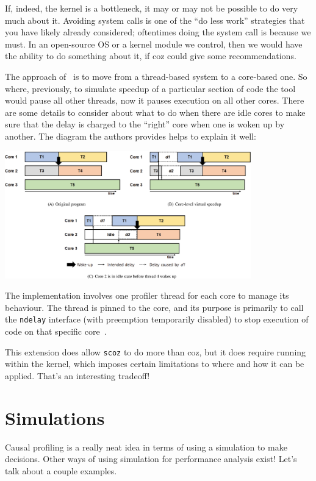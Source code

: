 If, indeed, the kernel is a bottleneck, it may or may not be possible to do very much about it. Avoiding system calls is one of the ``do less work'' strategies that you have likely already considered; oftentimes doing the system call is because we must. In an open-source OS or a kernel module we control, then we would have the ability to do something about it, if coz could give some recommendations.

The approach of~\cite{scoz} is to move from a thread-based system to a core-based one. So where, previously, to simulate speedup of a particular section of code the tool would pause all other threads, now it pauses execution on all other cores. There are some details to consider about what to do when there are idle cores to make sure that the delay is charged to the ``right'' core when one is woken up by another. The diagram the authors provides helps to explain it well:

\begin{center}
	\includegraphics[width=0.8\textwidth]{images/scoz-delay.jpg}
\end{center}

The implementation involves one profiler thread for each core to manage its behaviour. The thread is pinned to the core, and its purpose is primarily to call the \texttt{ndelay} interface (with preemption temporarily disabled) to stop execution of code on that specific core~\cite{scoz}. 

This extension does allow \texttt{scoz} to do more than coz, but it does require running within the kernel, which imposes certain limitations to where and how it can be applied. That's an interesting tradeoff!

\section*{Simulations}
Causal profiling is a really neat idea in terms of using a simulation to make decisions. Other ways of using simulation for performance analysis exist! Let's talk about a couple examples.

